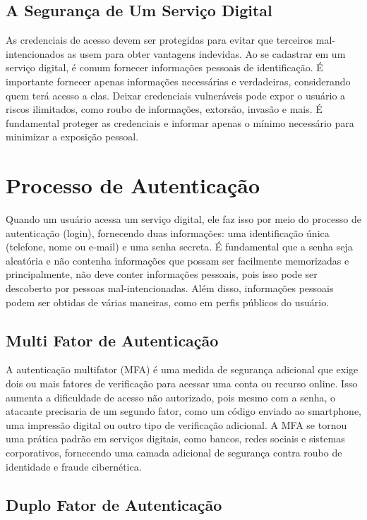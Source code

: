 \documentclass[12pt]{article}
\begin{document}
\subsection{A Segurança de Um Serviço Digital}

As credenciais de acesso devem ser protegidas para evitar que terceiros
mal-intencionados as usem para obter vantagens indevidas.
Ao se cadastrar em um serviço digital, é comum fornecer informações
pessoais de identificação.
É importante fornecer apenas informações necessárias e verdadeiras,
considerando quem terá acesso a elas. Deixar credenciais vulneráveis pode
expor o usuário a riscos ilimitados, como roubo de informações, extorsão,
invasão e mais.
É fundamental proteger as credenciais e informar apenas o mínimo necessário
para minimizar a exposição pessoal.

\section{Processo de Autenticação}

Quando um usuário acessa um serviço digital, ele faz isso por meio do
processo de autenticação (login), fornecendo duas informações: uma
identificação única (telefone, nome ou e-mail) e uma senha secreta.
É fundamental que a senha seja aleatória e não contenha informações
que possam ser facilmente memorizadas e principalmente, não deve conter
informações pessoais, pois isso pode ser descoberto por pessoas
mal-intencionadas.
Além disso, informações pessoais podem ser obtidas de várias maneiras,
como em perfis públicos do usuário.

\subsection{Multi Fator de Autenticação}

A autenticação multifator (MFA) é uma medida de segurança adicional que
exige dois ou mais fatores de verificação para acessar uma conta ou
recurso online.
Isso aumenta a dificuldade de acesso não autorizado, pois mesmo com a
senha, o atacante precisaria de um segundo fator, como um código
enviado ao smartphone, uma impressão digital ou outro tipo de
verificação adicional.
A MFA se tornou uma prática padrão em serviços digitais, como bancos,
redes sociais e sistemas corporativos, fornecendo uma camada adicional
de segurança contra roubo de identidade e fraude cibernética.

\subsection{Duplo Fator de Autenticação}
\end{document}
